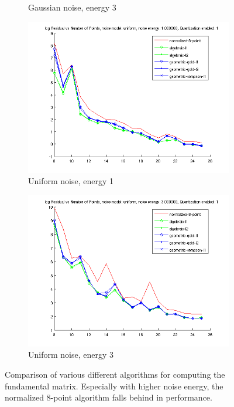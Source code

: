 \documentclass{paper}
\begin{document}
\begin{figure}
\begin{subfigure}{0.4\textwidth}
   \caption{Gaussian noise, energy 3}
\end{subfigure}
\begin{subfigure}{0.4\textwidth}
   \includegraphics[width=\textwidth]{noise_uniform1}
   \caption{Uniform noise, energy 1}
\end{subfigure}
\begin{subfigure}{0.4\textwidth}
   \includegraphics[width=\textwidth]{noise_uniform3}
   \caption{Uniform noise, energy 3}
\end{subfigure}
\caption{Comparison of various different algorithms for computing the 
fundamental matrix. Especially with higher noise energy, the normalized 8-point
algorithm falls behind in performance.}
\label{fig:cow}
\end{figure}


\end{document}
